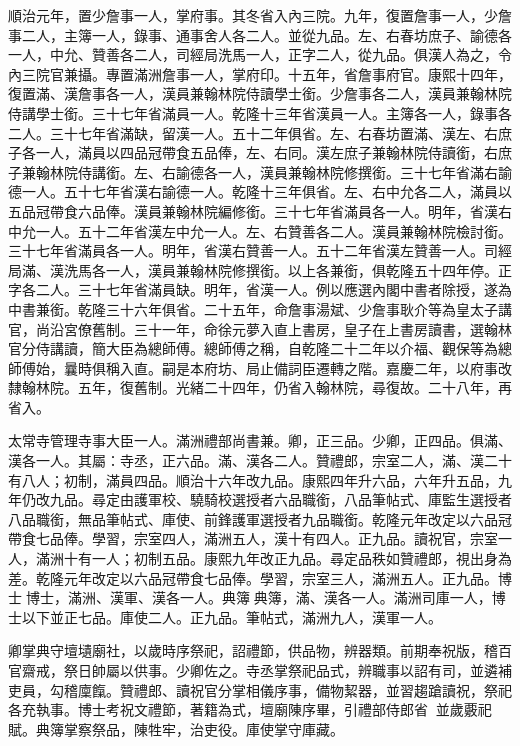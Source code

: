 \begin{pinyinscope}
順治元年，置少詹事一人，掌府事。其冬省入內三院。九年，復置詹事一人，少詹事二人，主簿一人，錄事、通事舍人各二人。並從九品。左、右春坊庶子、諭德各一人，中允、贊善各二人，司經局洗馬一人，正字二人，從九品。俱漢人為之，令內三院官兼攝。專置滿洲詹事一人，掌府印。十五年，省詹事府官。康熙十四年，復置滿、漢詹事各一人，漢員兼翰林院侍讀學士銜。少詹事各二人，漢員兼翰林院侍講學士銜。三十七年省滿員一人。乾隆十三年省漢員一人。主簿各一人，錄事各二人。三十七年省滿缺，留漢一人。五十二年俱省。左、右春坊置滿、漢左、右庶子各一人，滿員以四品冠帶食五品俸，左、右同。漢左庶子兼翰林院侍讀銜，右庶子兼翰林院侍講銜。左、右諭德各一人，漢員兼翰林院修撰銜。三十七年省滿右諭德一人。五十七年省漢右諭德一人。乾隆十三年俱省。左、右中允各二人，滿員以五品冠帶食六品俸。漢員兼翰林院編修銜。三十七年省滿員各一人。明年，省漢右中允一人。五十二年省漢左中允一人。左、右贊善各二人。漢員兼翰林院檢討銜。三十七年省滿員各一人。明年，省漢右贊善一人。五十二年省漢左贊善一人。司經局滿、漢洗馬各一人，漢員兼翰林院修撰銜。以上各兼銜，俱乾隆五十四年停。正字各二人。三十七年省滿員缺。明年，省漢一人。例以應選內閣中書者除授，遂為中書兼銜。乾隆三十六年俱省。二十五年，命詹事湯斌、少詹事耿介等為皇太子講官，尚沿宮僚舊制。三十一年，命徐元夢入直上書房，皇子在上書房讀書，選翰林官分侍講讀，簡大臣為總師傅。總師傅之稱，自乾隆二十二年以介福、觀保等為總師傅始，曩時俱稱入直。嗣是本府坊、局止備詞臣遷轉之階。嘉慶二年，以府事改隸翰林院。五年，復舊制。光緒二十四年，仍省入翰林院，尋復故。二十八年，再省入。

太常寺管理寺事大臣一人。滿洲禮部尚書兼。卿，正三品。少卿，正四品。俱滿、漢各一人。其屬：寺丞，正六品。滿、漢各二人。贊禮郎，宗室二人，滿、漢二十有八人；初制，滿員四品。順治十六年改九品。康熙四年升六品，六年升五品，九年仍改九品。尋定由護軍校、驍騎校選授者六品職銜，八品筆帖式、庫監生選授者八品職銜，無品筆帖式、庫使、前鋒護軍選授者九品職銜。乾隆元年改定以六品冠帶食七品俸。學習，宗室四人，滿洲五人，漢十有四人。正九品。讀祝官，宗室一人，滿洲十有一人；初制五品。康熙九年改正九品。尋定品秩如贊禮郎，視出身為差。乾隆元年改定以六品冠帶食七品俸。學習，宗室三人，滿洲五人。正九品。博士博士，滿洲、漢軍、漢各一人。典簿典簿，滿、漢各一人。滿洲司庫一人，博士以下並正七品。庫使二人。正九品。筆帖式，滿洲九人，漢軍一人。

卿掌典守壇壝廟社，以歲時序祭祀，詔禮節，供品物，辨器類。前期奉祝版，稽百官齋戒，祭日帥屬以供事。少卿佐之。寺丞掌祭祀品式，辨職事以詔有司，並遴補吏員，勾稽廩餼。贊禮郎、讀祝官分掌相儀序事，備物絜器，並習趨蹌讀祝，祭祀各充執事。博士考祝文禮節，著籍為式，壇廟陳序畢，引禮部侍郎省，並歲覈祀賦。典簿掌察祭品，陳牲牢，治吏役。庫使掌守庫藏。


\end{pinyinscope}
